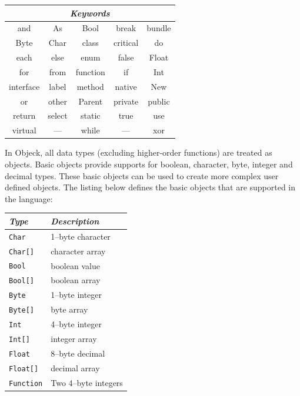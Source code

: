 \documentclass[12pt]{article}
\begin{document}
\begin{center}
  \begin{tabular}{ | c | c | c | c | c | }
    \hline
    \multicolumn{5}{|c|}{\emph{Keywords}} \\ \hline \hline
    and & As & Bool & break & bundle \\ \hline
    Byte & Char & class & critical & do \\ \hline
    each & else & enum & false & Float \\ \hline
    for & from & function & if & Int \\ \hline
    interface & label & method & native & New \\ \hline
    or & other & Parent & private & public \\ \hline
    return & select & static & true & use \\ \hline
   virtual & --- & while & --- & xor \\ \hline
  \end{tabular}
\end{center}

In Objeck, all data types (excluding higher-order functions) are
treated as objects. Basic objects provide supports for boolean,
character, byte, integer and decimal types.  These basic objects can
be used to create more complex user defined objects.  The listing below defines the basic objects that are supported in the language:

\begin{center}
  \begin{tabular}{| l | l |}
    \hline
    \emph{Type} & \emph{Description} \\ \hline \hline
    \texttt{Char} &  1--byte character \\ \hline
    \texttt{Char[]} &  character array \\ \hline
    \texttt{Bool} &  boolean value \\ \hline
    \texttt{Bool[]} &  boolean array \\ \hline
    \texttt{Byte} &  1--byte integer \\ \hline
    \texttt{Byte[]} &  byte array \\ \hline
    \texttt{Int} &  4--byte integer \\ \hline
    \texttt{Int[]} &  integer array \\ \hline
    \texttt{Float} &  8--byte decimal \\ \hline
    \texttt{Float[]} &  decimal array \\ \hline
    \texttt{Function} &  Two 4--byte integers \\ \hline
  \end{tabular}
\end{center}
\end{document}

